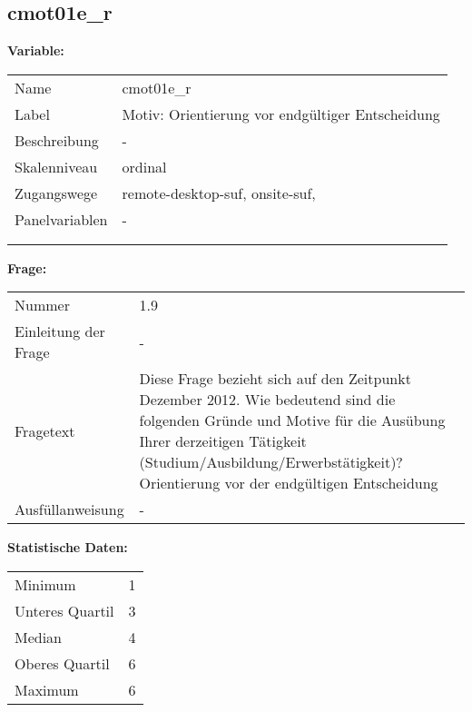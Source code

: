 	
	
	\subsection{cmot01e\_r}
	\label{subSection:cmot01e_r}

	\noindent\textbf{Variable:}\\
		\begin{tabular}{lL{11.3cm}}
			\label{tableVariable:cmot01e_r}
			Name & cmot01e\_r \\
			Label & Motiv: Orientierung vor endgültiger Entscheidung \\
			Beschreibung & - \\
			Skalenniveau & ordinal \\
			Zugangswege &
				remote-desktop-suf,
				onsite-suf,
 \\
			Panelvariablen & -
			 \\
			 \\
 \\
		\end{tabular}

		\vspace*{1 cm}
		\noindent\textbf{Frage:}\\
		\begin{tabular}{lL{11.3cm}}
			\label{tableQuestion:cmot01e_r}
			Nummer & 1.9 \\
			Einleitung der Frage & - \\
			Fragetext & Diese Frage bezieht sich auf den Zeitpunkt Dezember 2012. Wie bedeutend sind die folgenden Gründe und Motive für die Ausübung Ihrer derzeitigen Tätigkeit (Studium/Ausbildung/Erwerbstätigkeit)?
Orientierung vor der endgültigen Entscheidung \\
			Ausfüllanweisung & - \\
		\end{tabular}


		\vspace*{1 cm}
		\noindent\textbf{Statistische Daten:}\\
			\begin{tabular}{ll}
				\label{tableStatistics:cmot01e_r}
					Minimum & 1 \\
					Unteres Quartil & 3 \\
					Median & 4 \\
					Oberes Quartil & 6 \\
					Maximum & 6 \\
			\end{tabular}



